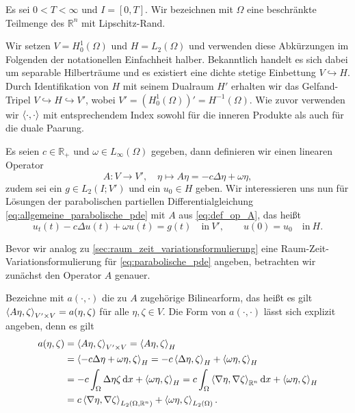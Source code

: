 Es sei $0 < T < \infty$ und $I = [0, T]$.
Wir bezeichnen mit $\Omega$ eine beschränkte Teilmenge des $\mathbb{R}^{n}$ mit Lipschitz-Rand.

Wir setzen $V = H^{1}_{0}(\Omega)$ und $H = L_{2}(\Omega)$ und verwenden diese Abkürzungen im Folgenden der notationellen Einfachheit halber.
Bekanntlich handelt es sich dabei um separable Hilberträume und es existiert eine dichte stetige Einbettung $V \hookrightarrow H$.
Durch Identifikation von $H$ mit seinem Dualraum $H'$ erhalten wir das Gelfand-Tripel $V \hookrightarrow H \hookrightarrow V'$, wobei $V' = (H^{1}_{0}(\Omega))' = H^{-1}(\Omega)$.
Wie zuvor verwenden wir $\left\langle\cdot,\cdot\right\rangle$ mit entsprechendem Index sowohl für die inneren Produkte als auch für die duale Paarung.

Es seien $c \in \mathbb{R}_{+}$ und $\omega \in L_{\infty}(\Omega)$ gegeben, dann definieren wir einen linearen Operator
\begin{equation}
    \label{eq:def_op_A}
    A \colon V \to V', \quad \eta \mapsto A \eta = - c \Delta \eta + \omega \eta,
\end{equation}
zudem sei ein $g \in L_{2}(I; V')$ und ein $u_{0} \in H$ geben.
Wir interessieren uns nun für Lösungen der parabolischen partiellen Differentialgleichung \eqref{eq:allgemeine_parabolische_pde} mit $A$ aus \eqref{eq:def_op_A}, das heißt
\begin{equation}
    \label{eq:parabolische_pde}
    u_{t}(t) - c \Delta u(t) + \omega u(t) = g(t) \quad \text{in}~V',
    \qquad
    u(0) = u_{0} \quad \text{in}~H.
\end{equation}

Bevor wir analog zu \autoref{sec:raum_zeit_variationsformulierung} eine Raum-Zeit-Variationsformulierung für \eqref{eq:parabolische_pde} angeben, betrachten wir zunächst den Operator $A$ genauer.

Bezeichne mit $a(\cdot, \cdot)$ die zu $A$ zugehörige Bilinearform, das heißt es gilt $\left\langle A \eta,\zeta\right\rangle_{V' \times V} = a(\eta, \zeta)$ für alle $\eta, \zeta \in V$.
Die Form von $a(\cdot, \cdot)$ lässt sich explizit angeben, denn es gilt
\begin{equation}
    \label{eq:bf_a}
    \begin{aligned}
        a(\eta, \zeta)
        &= \left\langle A \eta,\zeta\right\rangle_{V' \times V}
        = \left\langle A \eta,\zeta\right\rangle_{H}
        \\&= \left\langle- c \Delta \eta + \omega \eta,\zeta\right\rangle_{H}
        = - c \left\langle\Delta \eta,\zeta\right\rangle_{H} + \left\langle\omega \eta,\zeta\right\rangle_{H}
        \\&= -c \int_{\Omega} \Delta \eta \zeta \mathop{}\!\mathrm{d} x + \left\langle\omega \eta,\zeta\right\rangle_{H}
        = c \int_{\Omega} \left\langle\nabla \eta,\nabla \zeta\right\rangle_{\mathbb{R}^{n}} \mathop{}\!\mathrm{d} x + \left\langle\omega \eta,\zeta\right\rangle_{H}
        \\&= c \left\langle\nabla \eta,\nabla \zeta\right\rangle_{L_{2}(\Omega, \mathbb{R}^{n})} + \left\langle\omega \eta,\zeta\right\rangle_{L_{2}(\Omega)}.
    \end{aligned}
\end{equation}


